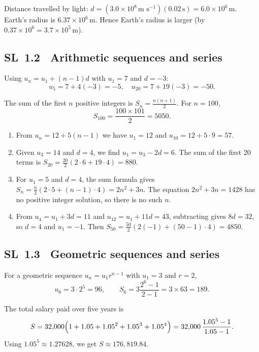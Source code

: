 \documentclass[11pt]{article}
\newcommand{\tocsubsection}[1]{\subsection{#1}}
\begin{document}
\begin{solution}
Distance travelled by light: \(d = (3.0\times10^{8}\,\text{m s}^{-1})(0.02\,\text{s}) = 6.0\times10^{6}\,\text{m}\).
Earth's radius is \(6.37\times10^{6}\,\text{m}\). Hence Earth's radius is larger (by \(0.37\times10^{6} = 3.7\times10^{5}\,\text{m}\)).
\end{solution}

\tocsubsection{SL 1.2 \; Arithmetic sequences and series}

\begin{solution}
Using $u_n = u_1 + (n-1)d$ with $u_1=7$ and $d=-3$:
\[
u_5 = 7 + 4(-3) = -5,\quad 
u_{20} = 7 + 19(-3) = -50.
\]
\end{solution}

\begin{solution}
The sum of the first $n$ positive integers is $S_n = \frac{n(n+1)}{2}$. For $n=100$,
\[
S_{100} = \frac{100\times 101}{2} = 5050.
\]
\end{solution}


\begin{solution}
\begin{enumerate}[label=(\alph*)]
\item From $u_n = 12 + 5(n-1)$ we have $u_1 = 12$ and $u_{10} = 12 + 5\cdot 9 = 57$.
\item Given $u_3 = 14$ and $d = 4$, we find $u_1 = u_3 - 2d = 6$.  The sum of the first 20 terms is $S_{20} = \frac{20}{2}(2\cdot 6 + 19\cdot 4) = 880$.
\item For $u_1=5$ and $d=4$, the sum formula gives $S_n = \frac{n}{2}(2\cdot 5 + (n-1)\cdot 4) = 2n^2 + 3n$.  The equation $2n^2+3n=1428$ has no positive integer solution, so there is no such $n$.
\item From $u_4 = u_1 + 3d = 11$ and $u_{12} = u_1 + 11d = 43$, subtracting gives $8d=32$, so $d=4$ and $u_1 = -1$.  Then $S_{50} = \frac{50}{2}(2(-1)+(50-1)\cdot 4) = 4850$.
\end{enumerate}
\end{solution}

\tocsubsection{SL 1.3 \; Geometric sequences and series}

\begin{solution}
For a geometric sequence $u_n = u_1 r^{n-1}$ with $u_1=3$ and $r=2$,
\[
u_6 = 3\cdot 2^{5} = 96,\qquad
S_6 = 3\frac{2^6 - 1}{2 - 1} = 3\times 63 = 189.
\]
\end{solution}

\begin{solution}
The total salary paid over five years is 
\[
S = 32{,}000\Bigl(1 + 1.05 + 1.05^2 + 1.05^3 + 1.05^4\Bigr)
= 32{,}000\,\frac{1.05^5 - 1}{1.05 - 1}.
\]
Using $1.05^5 \approx 1.27628$, we get $S \approx 176{,}819.84$.
\end{solution}
\end{document}
